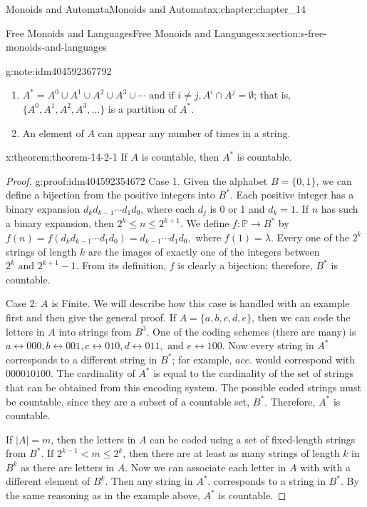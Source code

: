 \documentclass[twoside,10pt,]{book}
\numberwithin{equation}{section}
\begin{document}
\begin{chapterptx}{Monoids and Automata}{}{Monoids and Automata}{}{}{x:chapter:chapter_14}
\begin{sectionptx}{Free Monoids and Languages}{}{Free Monoids and Languages}{}{}{x:section:s-free-monoids-and-languages}
\begin{note}{}{g:note:idm404592367792}
\begin{enumerate}[label=(\alph*)]
\item{}\(A^*=A^0\cup A^1\cup A^2\cup A^3\cup \cdots \textrm{ and if } i\neq j,A^i\cap A^j=\emptyset\); that is, \(\{A^0,A^1,A^2,A^3,\ldots \}\) is a partition of \(A^*\).%
\item{}An element of \(A\) can appear any number of times in a string.%
\end{enumerate}
%
\end{note}
\begin{theorem}{}{}{x:theorem:theorem-14-2-1}%
If \(A\) is countable, then \(A^*\) is countable.%
\end{theorem}
\begin{proof}{}{g:proof:idm404592354672}
Case 1. Given the alphabet \(B=\{0,1\}\), we can define a bijection from the positive integers into \(B^*\). Each positive integer has a binary expansion \(d_kd_{k-1}\cdots d_1d_0\), where each \(d_j\) is 0 or 1 and \(d_k=1\). If \(n\) has such a binary expansion, then \(2^k \leq n\leq 2^{k+1}\). We define \(f:\mathbb{P}\to B^*\) by \(f(n)=f\left(d_kd_{k-1}\cdots  d_1d_0\right)=d_{k-1}\cdots d_1d_0,\)  where  \(f(1)=\lambda\). Every one of the \(2^k\) strings of length \(k\) are the images of exactly one of the integers between \(2^k\textrm{ and } 2^{k+1}-1.\) From its definition, \(f\) is clearly a bijection; therefore, \(B^*\) is countable.%
\par
Case 2: \(A\) is Finite. We will describe how this case is handled with an example first and then give the general proof. If \(A=\{a,b,c,d,e\}\), then we can code the letters in \(A\) into strings from \(B^3\). One of the coding schemes (there are many) is \(a\leftrightarrow 000, b\leftrightarrow
001, c\leftrightarrow 010, d\leftrightarrow 011, \textrm{ and } e\leftrightarrow 100\). Now every string in \(A^*\) corresponds to a different string in \(B^*\); for example, \(ace\).  would correspond with \(000010100\). The cardinality of \(A^*\) is equal to the cardinality of the set of strings that can be obtained from this encoding system. The possible coded strings must be countable, since they are a subset of a countable set, \(B^*\). Therefore, \(A^*\) is countable.%
\par
If \(\lvert A\rvert =m\), then the letters in \(A\) can be coded using a set of fixed-length strings from \(B^*\). If \(2^{k-1} < m \leq 2^k\), then there are at least as many strings of length \(k\) in \(B^k\) as there are letters in \(A\). Now we can associate each letter in \(A\) with with a different element of \(B^k\). Then any string in \(A^*\).  corresponds to a string in \(B^*\).  By the same reasoning as in the example above, \(A^*\) is countable.%

\end{proof}
\end{sectionptx}
\end{chapterptx}
\end{document}
